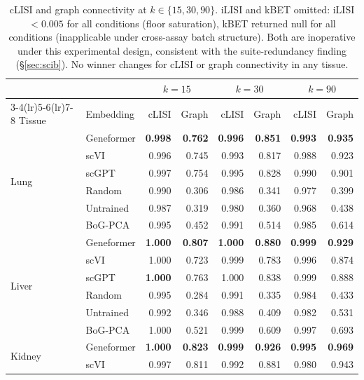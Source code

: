\documentclass[10pt,letterpaper]{article}
\begin{document}
\begin{table}[h!]
\centering
\caption{cLISI and graph connectivity at $k \in \{15, 30, 90\}$. iLISI and kBET omitted: iLISI $< 0.005$ for all conditions (floor saturation), kBET returned null for all conditions (inapplicable under cross-assay batch structure). Both are inoperative under this experimental design, consistent with the suite-redundancy finding (\S\ref{sec:scib}). No winner changes for cLISI or graph connectivity in any tissue.}
\label{tab:app_knn}
\scriptsize
\begin{tabular}{@{}ll rr rr rr@{}}
\toprule
 & & \multicolumn{2}{c}{$k = 15$} & \multicolumn{2}{c}{$k = 30$} & \multicolumn{2}{c}{$k = 90$} \\
\cmidrule(lr){3-4}\cmidrule(lr){5-6}\cmidrule(lr){7-8}
Tissue & Embedding & cLISI & Graph & cLISI & Graph & cLISI & Graph \\
\midrule
\multirow{6}{*}{Lung}
 & Geneformer & \textbf{0.998} & \textbf{0.762} & \textbf{0.996} & \textbf{0.851} & \textbf{0.993} & \textbf{0.935} \\
 & scVI       & 0.996 & 0.745 & 0.993 & 0.817 & 0.988 & 0.923 \\
 & scGPT      & 0.997 & 0.754 & 0.995 & 0.828 & 0.990 & 0.901 \\
 & Random     & 0.990 & 0.306 & 0.986 & 0.341 & 0.977 & 0.399 \\
 & Untrained  & 0.987 & 0.319 & 0.980 & 0.360 & 0.968 & 0.438 \\
 & BoG-PCA    & 0.995 & 0.452 & 0.991 & 0.514 & 0.985 & 0.614 \\
\midrule
\multirow{6}{*}{Liver}
 & Geneformer & \textbf{1.000} & \textbf{0.807} & \textbf{1.000} & \textbf{0.880} & \textbf{0.999} & \textbf{0.929} \\
 & scVI       & 1.000 & 0.723 & 0.999 & 0.783 & 0.996 & 0.874 \\
 & scGPT      & \textbf{1.000} & 0.763 & 1.000 & 0.838 & 0.999 & 0.888 \\
 & Random     & 0.995 & 0.284 & 0.991 & 0.335 & 0.984 & 0.433 \\
 & Untrained  & 0.992 & 0.346 & 0.988 & 0.409 & 0.982 & 0.531 \\
 & BoG-PCA    & 1.000 & 0.521 & 0.999 & 0.609 & 0.997 & 0.693 \\
\midrule
\multirow{6}{*}{Kidney}
 & Geneformer & \textbf{1.000} & \textbf{0.823} & \textbf{0.999} & \textbf{0.926} & \textbf{0.995} & \textbf{0.969} \\
 & scVI       & 0.997 & 0.811 & 0.992 & 0.881 & 0.980 & 0.943 \\

\end{tabular}
\end{table}
\end{document}
